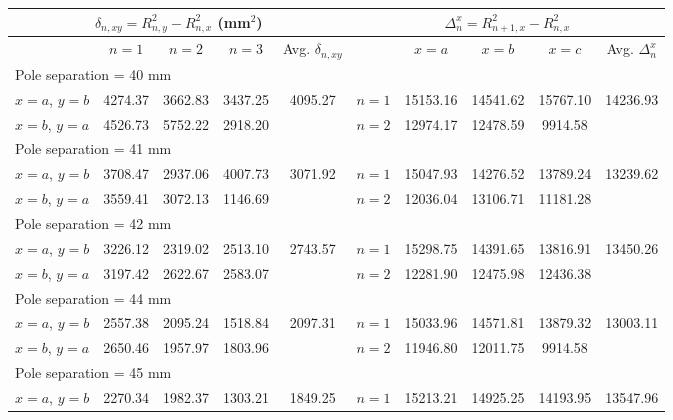 \begin{table*}
\begin{ruledtabular}
    \begin{tabular}{cccccccccc}
             \multicolumn{5}{c}{$\delta_{n,xy}=R^2_{n,y}-R^2_{n,x}$ (mm$^2$)} &   \multicolumn{5}{c}{$\Delta^x_n=R^2_{n+1,x}-R^2_{n,x}$}  \\ \hline
             & $n=1$       & $n=2$       & $n=3$       &  Avg. ${\delta_{n,xy}}$  &                   & $x=a$        & $x=b$       & $x=c$       &  Avg. $\Delta^x_n$ \\ \hline
            \multicolumn{10}{l}{Pole separation = 40 mm}  \\ \hline
            $x=a$, $y=b$& 4274.37 & 3662.83 & 3437.25 & \multirow{2}{*}{4095.27} & $n=1$ & 15153.16 & 14541.62 & 15767.10 & \multirow{2}{*}{14236.93} \\
            $x=b$, $y=a$ & 4526.73 & 5752.22 & 2918.20 &  & $n=2$ & 12974.17 & 12478.59 & 9914.58 & \\
            \hline
            \multicolumn{10}{l}{Pole separation = 41 mm}  \\ \hline
            $x=a$, $y=b$& 3708.47 & 2937.06 & 4007.73 & \multirow{2}{*}{3071.92} & $n=1$ & 15047.93 & 14276.52 & 13789.24 & \multirow{2}{*}{13239.62} \\
            $x=b$, $y=a$ & 3559.41 & 3072.13 & 1146.69 &  & $n=2$ & 12036.04 & 13106.71 & 11181.28 & \\ \hline
            \multicolumn{10}{l}{Pole separation = 42 mm}  \\ \hline
            $x=a$, $y=b$& 3226.12 & 2319.02 & 2513.10 & \multirow{2}{*}{2743.57} & $n=1$ & 15298.75 & 14391.65 & 13816.91 & \multirow{2}{*}{13450.26} \\
            $x=b$, $y=a$ & 3197.42 & 2622.67 & 2583.07 &  & $n=2$ & 12281.90 & 12475.98 & 12436.38 & \\\hline
            \multicolumn{10}{l}{Pole separation = 44 mm}  \\ \hline
            $x=a$, $y=b$& 2557.38 & 2095.24 & 1518.84 & \multirow{2}{*}{2097.31} & $n=1$ & 15033.96 & 14571.81 & 13879.32 & \multirow{2}{*}{13003.11} \\
            $x=b$, $y=a$ & 2650.46 & 1957.97 & 1803.96 &  & $n=2$ & 11946.80 & 12011.75 & 9914.58 & \\ \hline
            \multicolumn{10}{l}{Pole separation = 45 mm}  \\ \hline
            $x=a$, $y=b$& 2270.34 & 1982.37 & 1303.21 & \multirow{2}{*}{1849.25} & $n=1$ & 15213.21 & 14925.25 & 14193.95 & \multirow{2}{*}{13547.96} \\

\end{tabular}
\end{ruledtabular}
\end{table*}
